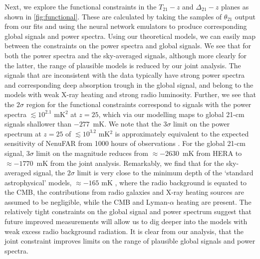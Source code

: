 Next, we explore the functional constraints in the $T_{21} - z$ and $\Delta_{21} - z$ planes as shown in \cref{fig:functional}. 
These are calculated by taking the samples of $\theta_{21}$ output from our fits and using the neural network emulators to produce corresponding global signals and power spectra. Using our theoretical models, we can easily map between the constraints on the power spectra and global signals. We see that for both the power spectra and the sky-averaged signals, although more clearly for the latter, the range of plausible models is reduced by our joint analysis. The signals that are inconsistent with the data typically have strong power spectra and corresponding deep absorption trough in the global signal, and belong to the models with weak X-ray heating and strong radio luminosity. Further, we see that the $2\sigma$ region for the functional constraints correspond to signals with the power spectra  $\lesssim 10^{2.1}$ mK$^2$ at $z=25$, which via our modelling maps to global 21-cm signals shallower than $-277$~mK. We note that the $3\sigma$ limit on the power spectrum at $z=25$ of $\lesssim10^{3.2}$ mK$^2$ is approximately equivalent to the expected sensitivity of NenuFAR from 1000 hours of observations \cite{Mertens_NenuFAR_2021}. For the global 21-cm signal, $3\sigma$ limit on the magnitude reduces from $\approx-2630$~mK from HERA to $\approx-1770$~mK from the joint analysis. Remarkably, we find that for the sky-averaged signal, the $2\sigma$ limit is very close to the minimum depth of the `standard astrophysical' models, $\approx -165$ mK \cite{Reis_sta_2021}, where the radio background is equated to the CMB, the contributions from radio galaxies and X-ray heating sources are assumed to be negligible, while the CMB and Lyman-$\alpha$ heating are present. The relatively tight constraints on the global signal and power spectrum suggest that future improved measurements  will allow us to dig deeper into the models with weak excess radio background radiation. It is clear from our analysis, that the joint constraint improves limits on the range of plausible global signals and power spectra.

